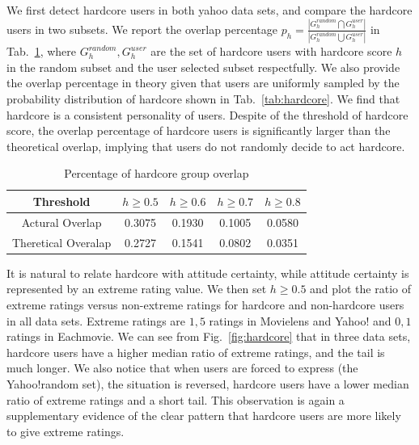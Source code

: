 \documentclass[sigconf]{acmart}
\begin{document}
We first detect hardcore users in both yahoo data sets, and compare the hardcore users in two subsets. We report the overlap percentage $p_h=\frac{|G_{h}^{random}\bigcap G_{h}^{user}|}{|G_{h}^{random}\bigcup G_{h}^{user}|}$ in Tab.~\ref{tab:overlap}, where $G_{h}^{random},G_{h}^{user}$ are the set of hardcore users with hardcore score $h$ in the random subset and the user selected subset respectfully. We also provide the overlap percentage in theory given that users are uniformly sampled by the probability distribution of hardcore shown in Tab.~\ref{tab:hardcore}. We find that hardcore is a consistent personality of users. Despite of the threshold of hardcore score, the overlap percentage of hardcore users is significantly larger than the theoretical overlap, implying that users do not randomly decide to act hardcore.

\begin{table}[htbp]
\centering
\caption{Percentage of hardcore group overlap}\label{tab:overlap}
\centering
\begin{tabular}{|c|c|c|c|c|}
\hline
 Threshold & $h\geq 0.5$ & $h\geq 0.6$ & $h \geq 0.7$ & $h\geq 0.8$ \\\hline\hline
Actural Overlap& 0.3075 &	0.1930 &	0.1005 & 0.0580 \\\hline
Theretical Overalap & 0.2727 &  0.1541 &  0.0802 & 0.0351\\
\hline
\end{tabular}
\end{table}

It is natural to relate hardcore with attitude certainty, while attitude certainty is represented by an extreme rating value. We then set $h\geq 0.5$ and plot the ratio of extreme ratings versus non-extreme ratings for hardcore and non-hardcore users in all data sets. Extreme ratings are $1,5$ ratings in Movielens and Yahoo! and $0,1$ ratings in Eachmovie. We can see from Fig.~\ref{fig:hardcore} that in three data sets, hardcore users have a higher median ratio of extreme ratings, and the tail is much longer. We also notice that when users are forced to express (the Yahoo!random set), the situation is reversed, hardcore users have a lower median ratio of extreme ratings and a short tail.  This observation is again a supplementary evidence of the clear pattern that hardcore users are more likely to give extreme ratings.
\end{document}
